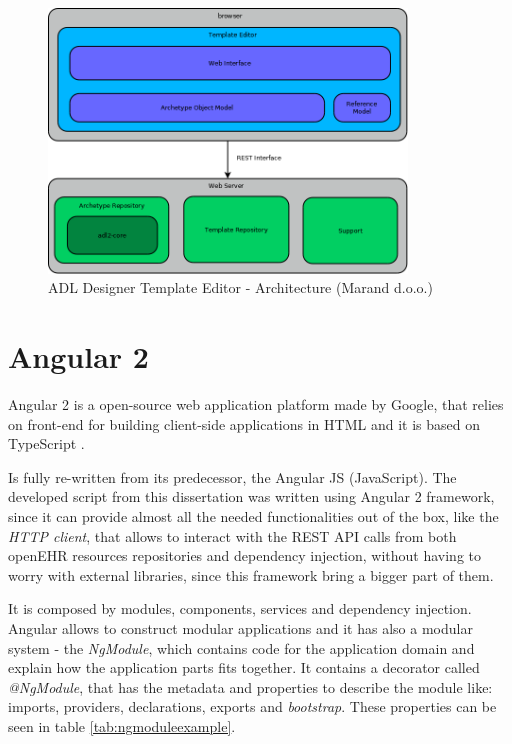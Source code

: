 \documentclass[mim_thesis.tex]{subfiles}
\begin{document}
\begin{figure}[H]
	\centering
    \includegraphics[width=0.85\textwidth]{img/template-editor-architecture.png}
	\caption{ADL Designer Template Editor - Architecture  (Marand d.o.o.)}
	\label{fig:templateEditorArchitecture}
\end{figure}

\section{Angular 2}
Angular 2 is a open-source web application platform made by Google, that relies on front-end for building client-side applications in \ac{HTML} and it is based on TypeScript \citep{angular}.

Is fully re-written from its predecessor, the Angular JS (JavaScript). The developed script from this dissertation was written using Angular 2 framework, since it can provide almost all the needed functionalities out of the box, like the \textit{HTTP client}, that allows to interact with the REST API calls from both openEHR resources repositories and dependency injection, without having to worry with external libraries, since this framework bring a bigger part of them.

It is composed by modules, components, services and dependency injection. 
Angular allows to construct modular applications and it has also a modular system - the \textit{NgModule}, which contains code for the application domain and explain how the application parts fits together. It contains a decorator called \textit{@NgModule}, that has the metadata and properties to describe the module like: imports, providers, declarations, exports and \textit{bootstrap}. These properties can be seen in table \ref{tab:ngmoduleexample}. 
\end{document}
